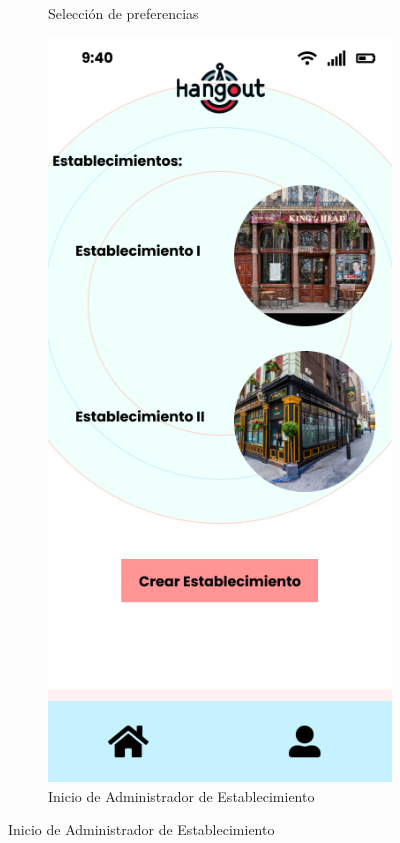 \begin{figure}[H]
\begin{subfigure}{0.45\textwidth}
        \caption{Selección de preferencias}
        \label{fig:img3}
    \end{subfigure}%
    \hfill
    \begin{subfigure}{0.45\textwidth}
        \centering
        \includegraphics[width=\linewidth]{imagenes/mockup4.png}
        \caption{Inicio de Administrador de Establecimiento}
        \label{fig:img4}
    \end{subfigure}
\end{figure}
\vspace*{\fill}


